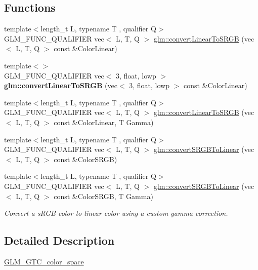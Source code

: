 \subsection*{Functions}
\begin{DoxyCompactItemize}
\item 
{\footnotesize template$<$length\+\_\+t L, typename T , qualifier Q$>$ }\\G\+L\+M\+\_\+\+F\+U\+N\+C\+\_\+\+Q\+U\+A\+L\+I\+F\+I\+ER vec$<$ L, T, Q $>$ \hyperlink{group__gtc__color__space_ga42239e7b3da900f7ef37cec7e2476579}{glm\+::convert\+Linear\+To\+S\+R\+GB} (vec$<$ L, T, Q $>$ const \&Color\+Linear)
\item 
\mbox{\label{gtc_2color__space_8inl_a45c5c68bea13598b1794da72b79dbb08}} 
{\footnotesize template$<$$>$ }\\G\+L\+M\+\_\+\+F\+U\+N\+C\+\_\+\+Q\+U\+A\+L\+I\+F\+I\+ER vec$<$ 3, float, lowp $>$ {\bfseries glm\+::convert\+Linear\+To\+S\+R\+GB} (vec$<$ 3, float, lowp $>$ const \&Color\+Linear)
\item 
{\footnotesize template$<$length\+\_\+t L, typename T , qualifier Q$>$ }\\G\+L\+M\+\_\+\+F\+U\+N\+C\+\_\+\+Q\+U\+A\+L\+I\+F\+I\+ER vec$<$ L, T, Q $>$ \hyperlink{group__gtc__color__space_gaace0a21167d13d26116c283009af57f6}{glm\+::convert\+Linear\+To\+S\+R\+GB} (vec$<$ L, T, Q $>$ const \&Color\+Linear, T Gamma)
\item 
{\footnotesize template$<$length\+\_\+t L, typename T , qualifier Q$>$ }\\G\+L\+M\+\_\+\+F\+U\+N\+C\+\_\+\+Q\+U\+A\+L\+I\+F\+I\+ER vec$<$ L, T, Q $>$ \hyperlink{group__gtc__color__space_ga16c798b7a226b2c3079dedc55083d187}{glm\+::convert\+S\+R\+G\+B\+To\+Linear} (vec$<$ L, T, Q $>$ const \&Color\+S\+R\+GB)
\item 
{\footnotesize template$<$length\+\_\+t L, typename T , qualifier Q$>$ }\\G\+L\+M\+\_\+\+F\+U\+N\+C\+\_\+\+Q\+U\+A\+L\+I\+F\+I\+ER vec$<$ L, T, Q $>$ \hyperlink{group__gtc__color__space_gad1b91f27a9726c9cb403f9fee6e2e200}{glm\+::convert\+S\+R\+G\+B\+To\+Linear} (vec$<$ L, T, Q $>$ const \&Color\+S\+R\+GB, T Gamma)
\begin{DoxyCompactList}\small\item\em Convert a s\+R\+GB color to linear color using a custom gamma correction. \end{DoxyCompactList}\end{DoxyCompactItemize}


\subsection{Detailed Description}
\hyperlink{group__gtc__color__space}{G\+L\+M\+\_\+\+G\+T\+C\+\_\+color\+\_\+space} 